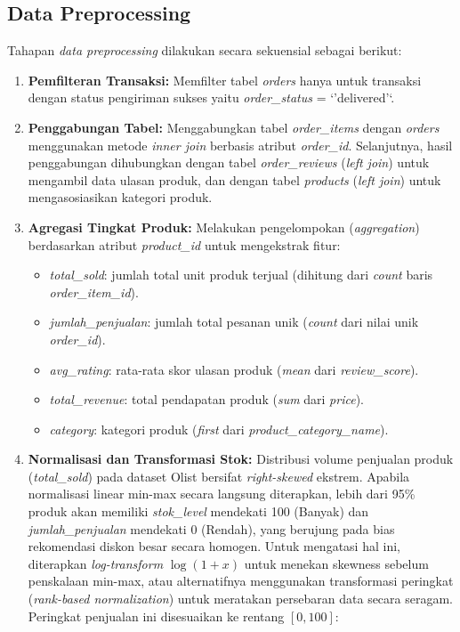 \documentclass[conference]{IEEEtran}
\begin{document}
\subsection{Data Preprocessing}
Tahapan \textit{data preprocessing} dilakukan secara sekuensial sebagai berikut:
\begin{enumerate}
    \item \textbf{Pemfilteran Transaksi:} Memfilter tabel \textit{orders} hanya untuk transaksi dengan status pengiriman sukses yaitu \textit{order\_status} = `'delivered'`.
    \item \textbf{Penggabungan Tabel:} Menggabungkan tabel \textit{order\_items} dengan \textit{orders} menggunakan metode \textit{inner join} berbasis atribut \textit{order\_id}. Selanjutnya, hasil penggabungan dihubungkan dengan tabel \textit{order\_reviews} (\textit{left join}) untuk mengambil data ulasan produk, dan dengan tabel \textit{products} (\textit{left join}) untuk mengasosiasikan kategori produk.
    \item \textbf{Agregasi Tingkat Produk:} Melakukan pengelompokan (\textit{aggregation}) berdasarkan atribut \textit{product\_id} untuk mengekstrak fitur:
    \begin{itemize}
        \item \textit{total\_sold}: jumlah total unit produk terjual (dihitung dari \textit{count} baris \textit{order\_item\_id}).
        \item \textit{jumlah\_penjualan}: jumlah total pesanan unik (\textit{count} dari nilai unik \textit{order\_id}).
        \item \textit{avg\_rating}: rata-rata skor ulasan produk (\textit{mean} dari \textit{review\_score}).
        \item \textit{total\_revenue}: total pendapatan produk (\textit{sum} dari \textit{price}).
        \item \textit{category}: kategori produk (\textit{first} dari \textit{product\_category\_name}).
    \end{itemize}
    \item \textbf{Normalisasi dan Transformasi Stok:} Distribusi volume penjualan produk (\textit{total\_sold}) pada dataset Olist bersifat \textit{right-skewed} ekstrem. Apabila normalisasi linear min-max secara langsung diterapkan, lebih dari 95\% produk akan memiliki \textit{stok\_level} mendekati 100 (Banyak) dan \textit{jumlah\_penjualan} mendekati 0 (Rendah), yang berujung pada bias rekomendasi diskon besar secara homogen. Untuk mengatasi hal ini, diterapkan \textit{log-transform} $\log(1 + x)$ untuk menekan skewness sebelum penskalaan min-max, atau alternatifnya menggunakan transformasi peringkat (\textit{rank-based normalization}) untuk meratakan persebaran data secara seragam. Peringkat penjualan ini disesuaikan ke rentang $[0, 100]$:

\end{enumerate}
\end{document}
